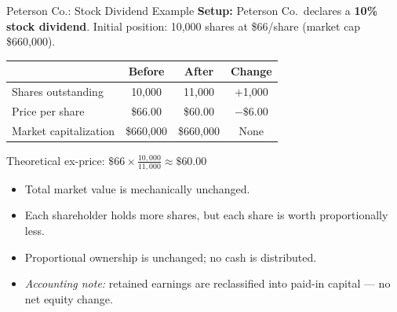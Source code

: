 \begin{frame}{Peterson Co.: Stock Dividend Example}
\small
\textbf{Setup:} Peterson Co.\ declares a \textbf{10\% stock dividend}. Initial position: 10,000 shares at \$66/share (market cap \$660,000).

\vspace{3mm}
\begin{center}
\begin{tabular}{lccc}
\toprule
 & \textbf{Before} & \textbf{After} & \textbf{Change} \\
\midrule
Shares outstanding & 10,000 & 11,000 & $+$1,000 \\
Price per share & \$66.00 & \$60.00 & $-\$6.00$ \\
Market capitalization & \$660,000 & \$660,000 & None \\
\bottomrule
\end{tabular}
\end{center}

\vspace{2mm}
{\footnotesize Theoretical ex-price: $\$66 \times \frac{10{,}000}{11{,}000} \approx \$60.00$}

\vspace{2mm}
\begin{itemize}
    \item Total market value is mechanically unchanged.
    \item Each shareholder holds more shares, but each share is worth proportionally less.
    \item Proportional ownership is unchanged; no cash is distributed.
    \item \textit{Accounting note:} retained earnings are reclassified into paid-in capital --- no net equity change.
\end{itemize}
\end{frame}

